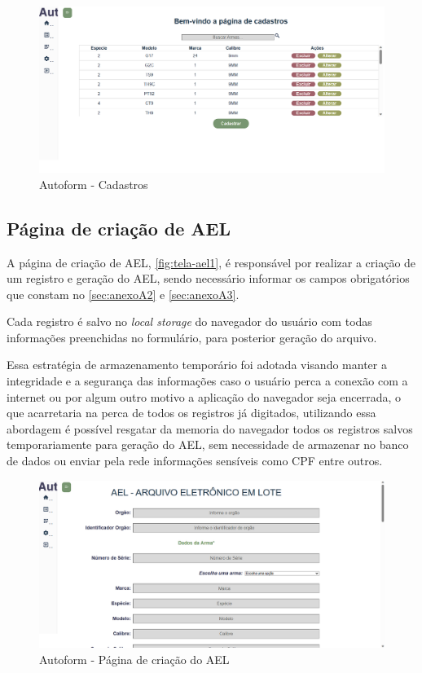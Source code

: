 \begin{figure}[H]
    \caption{\label{fig:tela-cadastros-armas}Autoform - Cadastros}
    \begin{center}
        \includegraphics[scale=0.45]{imagens/autoform-cadastros.png}
    \end{center}
\end{figure}

\subsection{Página de criação de AEL}
A página de criação de AEL, \autoref{fig:tela-ael1}, é responsável por realizar a criação de um registro e geração do AEL, sendo necessário informar os campos obrigatórios que constam no \autoref{sec:anexoA2} e \autoref{sec:anexoA3}.

Cada registro é salvo no \textit{local storage} do navegador do usuário com todas informações preenchidas no formulário, para posterior geração do arquivo. 

Essa estratégia de armazenamento temporário foi adotada visando manter a integridade e a segurança das informações caso o usuário perca a conexão com a internet ou por algum outro motivo a aplicação do navegador seja encerrada, o que acarretaria na perca de todos os registros já digitados, utilizando essa abordagem é possível resgatar da memoria do navegador todos os registros salvos temporariamente para geração do AEL, sem necessidade de armazenar no banco de dados ou enviar pela rede informações sensíveis como CPF entre outros. 
\begin{figure}[htb]
    \caption{\label{fig:tela-ael1}Autoform - Página de criação do AEL}
    \begin{center}
        \includegraphics[scale=0.45]{imagens/autoform-ael-gerar.png}
    \end{center}
\end{figure}

